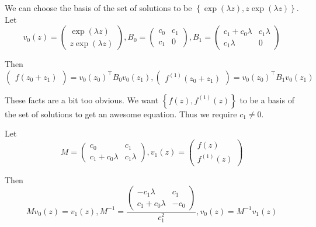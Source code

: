 \documentclass[]{article}
\newcommand{\pqty}[1]{{\left(#1\right)}}
\newcommand{\Bqty}[1]{{\left\{#1\right\}}}
\numberwithin{equation}{section}
\begin{document}
	We can choose the basis of the set of solutions to be $\Bqty{\exp\pqty{\lambda z}, z\exp\pqty{\lambda z}}$.
	Let
	\begin{equation}
		v_0\pqty{z}=
		\begin{pmatrix}
			\exp\pqty{\lambda z} \\
			z\exp\pqty{\lambda z}
		\end{pmatrix}
		,
		B_0=
		\begin{pmatrix}
			c_0 & c_1 \\
			c_1 & 0
		\end{pmatrix}
		,
		B_1=
		\begin{pmatrix}
			c_1+c_0\lambda & c_1 \lambda \\
			c_1 \lambda & 0
		\end{pmatrix}
	\end{equation}
	
	Then
	\begin{equation}
		\begin{pmatrix}
			f\pqty{z_0+z_1}
		\end{pmatrix}
		=v_0\pqty{z_0}^\top B_0 v_0\pqty{z_1}
		,
		\begin{pmatrix}
			f^\pqty{1}\pqty{z_0+z_1}
		\end{pmatrix}
		=v_0\pqty{z_0}^\top B_1 v_0\pqty{z_1}
	\end{equation}
	
	These facts are a bit too obvious. We want $\Bqty{f\pqty{z},f^\pqty{1}\pqty{z}}$ to be a basis of the set of solutions to get an awesome equation. Thus we require $c_1\neq 0$.
	
	Let
	\begin{equation}
		M=
		\begin{pmatrix}
			c_0 & c_1 \\
			c_1+c_0 \lambda & c_1 \lambda
		\end{pmatrix}
		,
		v_1\pqty{z}=
		\begin{pmatrix}
			f\pqty{z} \\
			f^\pqty{1}\pqty{z}
		\end{pmatrix}
	\end{equation}
	
	Then
	\begin{equation}
		M v_0\pqty{z}=v_1\pqty{z}
		,
		M^{-1}=
		\frac{\begin{pmatrix}
			-c_1 \lambda & c_1 \\
			c_1+c_0\lambda & -c_0
		\end{pmatrix}}{c_1^2}
		,
		v_0\pqty{z}=M^{-1} v_1\pqty{z}
	\end{equation}
	
\end{document}
